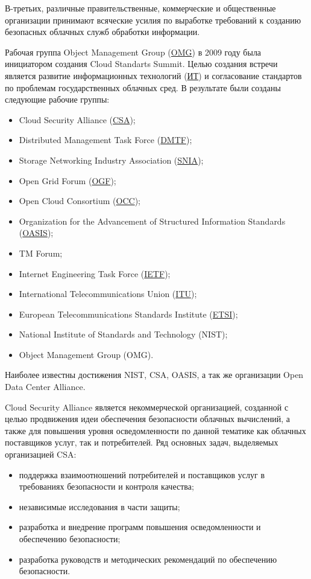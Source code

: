 В-третьих, различные правительственные, коммерческие и общественные организации принимают всяческие усилия по выработке требований к созданию безопасных облачных служб обработки информации.

Рабочая группа Object Management Group (\hyperlink{omg}{OMG}) в 2009 году была инициатором создания Cloud Standarts Summit.
Целью создания встречи является развитие информационных технологий (\hyperlink{it}{ИТ}) и согласование стандартов по проблемам государственных облачных сред.
В результате были созданы следующие рабочие группы:
\begin{itemize}
  \item Cloud Security Alliance (\hyperlink{csa}{CSA});
  \item Distributed Management Task Force (\hyperlink{dmtf}{DMTF});
  \item Storage Networking Industry Association (\hyperlink{snia}{SNIA});
  \item Open Grid Forum (\hyperlink{ogf}{OGF});
  \item Open Cloud Consortium (\hyperlink{occ}{OCC});
  \item Organization for the Advancement of Structured Information Standards (\hyperlink{oasis}{OASIS});
  \item TM Forum;
  \item Internet Engineering Task Force (\hyperlink{ietf}{IETF});
  \item International Telecommunications Union (\hyperlink{itu}{ITU});
  \item European Telecommunications Standards Institute (\hyperlink{etsi}{ETSI});
  \item National Institute of Standards and Technology (NIST);
  \item Object Management Group (OMG).
\end{itemize}

Наиболее известны достижения NIST, CSA, OASIS, а так же организации Open Data Center Alliance.

Cloud Security Alliance является некоммерческой организацией, созданной с целью продвижения идеи обеспечения безопасности облачных вычислений, а также для повышения уровня осведомленности по данной тематике как облачных поставщиков услуг, так и потребителей.
Ряд основных задач, выделяемых организацией CSA:
\begin{itemize}
  \item поддержка взаимоотношений потребителей и поставщиков услуг в требованиях безопасности и контроля качества;
  \item независимые исследования в части защиты;
  \item разработка и внедрение программ повышения осведомленности и обеспечению безопасности;
  \item разработка руководств и методических рекомендаций по обеспечению безопасности.
\end{itemize}

